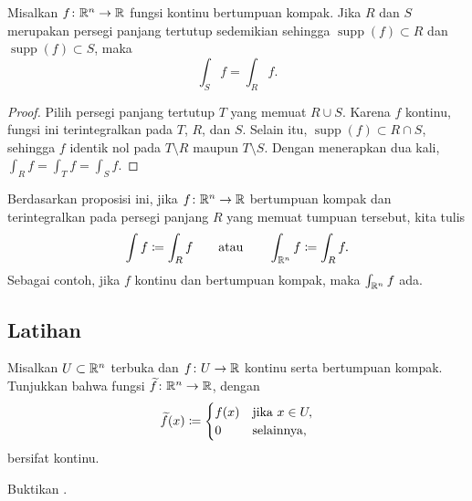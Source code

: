 \begin{prop} \label{mv:prop:rectanglessupp}
Misalkan $f \colon {\mathbb{R}}^n \to {\mathbb{R}}$ fungsi kontinu bertumpuan kompak. Jika $R$ dan
$S$ merupakan persegi panjang tertutup sedemikian sehingga
$\operatorname{supp}(f) \subset R$
dan
$\operatorname{supp}(f) \subset S$, maka
\begin{equation*}
\int_S f = \int_R f .
\end{equation*}
\end{prop}

\begin{proof}
Pilih persegi panjang tertutup $T$ yang memuat $R\cup S$. Karena $f$ kontinu,
fungsi ini terintegralkan pada $T$, $R$, dan $S$. Selain itu,
$\operatorname{supp}(f)\subset R\cap S$, sehingga $f$ identik nol pada
$T\setminus R$ maupun $T\setminus S$. Dengan menerapkan
 dua kali,
$\int_R f = \int_T f = \int_S f$.
\end{proof}

Berdasarkan proposisi ini, jika $f \colon {\mathbb{R}}^n \to {\mathbb{R}}$ bertumpuan kompak dan
terintegralkan pada persegi panjang $R$ yang memuat tumpuan tersebut, kita tulis
\begin{equation*}
\int f \coloneqq \int_R f \qquad \text{atau} \qquad 
\int_{{\mathbb{R}}^n} f \coloneqq \int_R f .
\end{equation*}
Sebagai contoh, jika $f$ kontinu dan bertumpuan kompak, maka
$\int_{{\mathbb{R}}^n} f$ ada.

\subsection{Latihan}

\begin{exercise} \label{exercise:contcompactsupportRn}
Misalkan $U \subset {\mathbb{R}}^n$ terbuka dan $f \colon U \to {\mathbb{R}}$ kontinu serta
bertumpuan kompak. Tunjukkan bahwa fungsi $\widetilde{f} \colon {\mathbb{R}}^n \to
{\mathbb{R}}$, dengan
\begin{equation*}
\widetilde{f}(x) \coloneqq
\begin{cases}
f(x) & \text{jika } x \in U, \\
0 & \text{selainnya,}
\end{cases}
\avoidbreak
\end{equation*}
bersifat kontinu.
\end{exercise}


\begin{exercise}
Buktikan .
\end{exercise}


